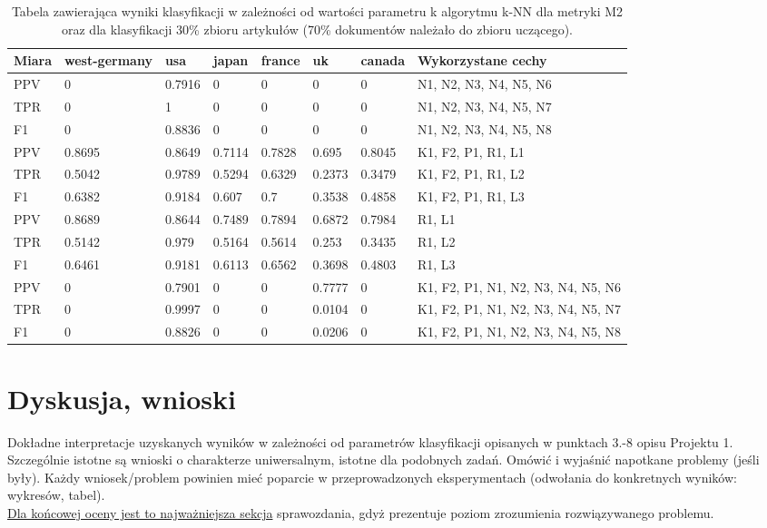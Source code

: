 \documentclass{classrep}
\begin{document}
\begin{table}[H]
    \centering
\caption{Tabela zawierająca wyniki klasyfikacji w zależności od wartości parametru k algorytmu k-NN dla metryki M2 oraz dla klasyfikacji 30\% zbioru artykułów (70\% dokumentów należało do zbioru uczącego).}
\begin{adjustbox}{max width=\textwidth}
    \begin{tabular}{|l|l|l|l|l|l|l|l|}
    \hline
        Miara & west-germany  & usa  & japan & france & uk & canada & Wykorzystane cechy \\ \hline
        PPV & 0 & 0.7916 & 0 & 0 & 0 & 0 & N1, N2, N3, N4, N5, N6 \\ \hline
        TPR & 0 & 1 & 0 & 0 & 0 & 0 & N1, N2, N3, N4, N5, N7 \\ \hline
        F1 & 0 & 0.8836 & 0 & 0 & 0 & 0 & N1, N2, N3, N4, N5, N8 \\ \hline
        PPV & 0.8695 & 0.8649 & 0.7114 & 0.7828 & 0.695 & 0.8045 & K1, F2, P1, R1, L1 \\ \hline
        TPR & 0.5042 & 0.9789 & 0.5294 & 0.6329 & 0.2373 & 0.3479 & K1, F2, P1, R1, L2 \\ \hline
        F1 & 0.6382 & 0.9184 & 0.607 & 0.7 & 0.3538 & 0.4858 & K1, F2, P1, R1, L3 \\ \hline
        PPV & 0.8689 & 0.8644 & 0.7489 & 0.7894 & 0.6872 & 0.7984 & R1, L1 \\ \hline
        TPR & 0.5142 & 0.979 & 0.5164 & 0.5614 & 0.253 & 0.3435 & R1, L2 \\ \hline
        F1 & 0.6461 & 0.9181 & 0.6113 & 0.6562 & 0.3698 & 0.4803 & R1, L3 \\ \hline
        PPV & 0 & 0.7901 & 0 & 0 & 0.7777 & 0 & K1, F2, P1, N1, N2, N3, N4, N5, N6 \\ \hline
        TPR & 0 & 0.9997 & 0 & 0 & 0.0104 & 0 & K1, F2, P1, N1, N2, N3, N4, N5, N7 \\ \hline
        F1 & 0 & 0.8826 & 0 & 0 & 0.0206 & 0 & K1, F2, P1, N1, N2, N3, N4, N5, N8 \\ \hline
    \end{tabular}
\end{adjustbox}
\end{table}

\section{Dyskusja, wnioski}
Dokładne interpretacje uzyskanych wyników w zależności od parametrów klasyfikacji
opisanych w punktach 3.-8 opisu Projektu 1. 
Szczególnie istotne są wnioski o charakterze uniwersalnym, istotne dla podobnych zadań. 
Omówić i wyjaśnić napotkane problemy (jeśli były). Każdy wniosek/problem powinien mieć poparcie
w przeprowadzonych eksperymentach (odwołania do konkretnych wyników: wykresów,
tabel). \\
\underline{Dla końcowej oceny jest to najważniejsza sekcja} sprawozdania, gdyż prezentuje poziom
zrozumienia rozwiązywanego problemu.\\
\end{document}
